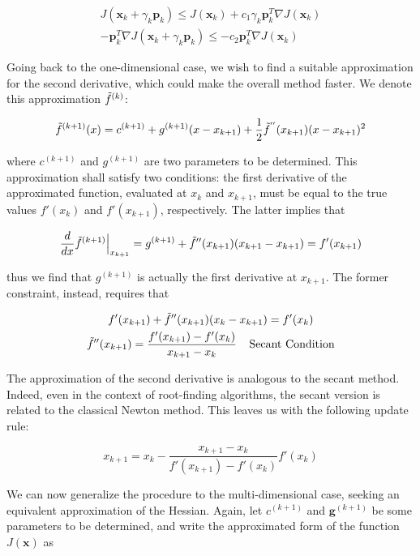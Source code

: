 \documentclass{article}
\numberwithin{equation}{subsection}
\begin{document}
\begin{gather*}
    J(\textbf{x}_k + \gamma_k \textbf{p}_k) \leq J(\textbf{x}_k) + c_1 \gamma_k \textbf{p}_k^T \nabla J(\textbf{x}_k) \\
    -\textbf{p}_k^T \nabla J(\textbf{x}_k+\gamma_k \textbf{p}_k) \leq -c_2 \textbf{p}_k^T \nabla J(\textbf{x}_k)
\end{gather*}

Going back to the one-dimensional case, we wish to find a suitable approximation for the second derivative, which could make the overall method faster. We denote this approximation $\Tilde{f}^{(k)}$:

\begin{equation*}
    \Tilde{f}^{(k+1)}(x) = c^{(k+1)} + g^{(k+1)}(x - x_{k+1}) + \frac{1}{2} \Tilde{f}^{''}(x_{k+1}) (x-x_{k+1})^2 
\end{equation*}

where $c^{(k+1)}$ and $g^{(k+1)}$ are two parameters to be determined. This approximation shall satisfy two conditions: the first derivative of the approximated function, evaluated at $x_k$ and $x_{k+1}$, must be equal to the true values $f'(x_k)$ and $f'(x_{k+1})$, respectively. The latter implies that

\begin{gather*}
    \frac{d}{dx}\Tilde{f}^{(k+1)} \Big\vert_{x_{k+1}} = g^{(k+1)} + \Tilde{f}''(x_{k+1}) ( x_{k+1} - x_{k+1}) = f'(x_{k+1})
\end{gather*}

thus we find that $g^{(k+1)}$ is actually the first derivative at $x_{k+1}$. The former constraint, instead, requires that

\begin{gather*}
    f'(x_{k+1}) + \Tilde{f}''(x_{k+1}) (x_k - x_{k+1}) = f'(x_k) \\
    \Tilde{f}''(x_{k+1}) = \frac{f'(x_{k+1}) - f'(x_k)}{x_{k+1}-x_k} \;\;\;\; \text{Secant Condition}
\end{gather*}

The approximation of the second derivative is analogous to the secant method. Indeed, even in the context of root-finding algorithms, the secant version is related to the classical Newton method. This leaves us with the following update rule:

\begin{equation}
    x_{k+1} = x_k - \frac{x_{k+1}-x_k}{f'(x_{k+1}) - f'(x_k)} f'(x_k)
\end{equation}

We can now generalize the procedure to the multi-dimensional case, seeking an equivalent approximation of the Hessian. Again, let $c^{(k+1)}$ and $\textbf{g}^{(k+1)}$ be some parameters to be determined, and write the approximated form of the function $J(\textbf{x})$ as 
\end{document}
